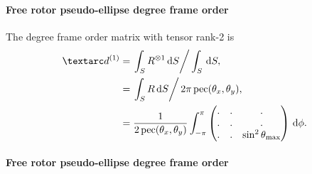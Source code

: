 \paragraph{Free rotor pseudo-ellipse  degree frame order}

The  degree frame order matrix with tensor rank-2 is
\begin{subequations} \label{eq: pseudo-ellipse, free rotor 1st degree frame order matrix}
\begin{align}
    \FOone &= \left. \int_S R^{\otimes 1} \diff S \right / \int_S \diff S , \\
           &= \left. \int_S R \diff S \right / 2\pi \pec(\conethetax, \conethetay) , \\
           &= \frac{1}{2\pec(\conethetax, \conethetay)}
                \int_{-\pi}^{\pi}
                \begin{pmatrix}
                    . & . & . \\
                    . & . & . \\
                    . & . & \sin^2\conethetamax \\
                \end{pmatrix}
                \diff\phi .
\end{align}
\end{subequations}


\paragraph{Free rotor pseudo-ellipse  degree frame order}

